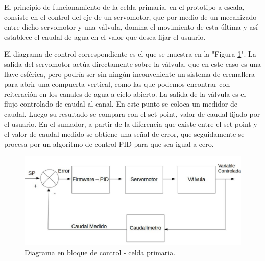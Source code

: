 El principio de funcionamiento de la celda primaria, en el prototipo a escala, consiste en el control del eje de un servomotor, que por medio de un mecanizado entre dicho servomotor y una válvula, domina el movimiento de esta última y así establece el caudal de agua en el valor que desea fijar el usuario.

El diagrama de control correspondiente es el que se muestra en la "Figura \ref{fig:CeldaPrimaria}". La salida del servomotor actúa directamente sobre la válvula, que en este caso es una llave esférica, pero podría ser sin ningún inconveniente un sistema de cremallera para abrir una compuerta vertical, como las que podemos encontrar con reiteración en los canales de agua a cielo abierto. La salida de la válvula es el flujo controlado de caudal al canal. En este punto se coloca un medidor de caudal. Luego su resultado se compara con el set point, valor de caudal fijado por el usuario. En el sumador, a partir de la diferencia que existe entre el set point y el valor de caudal medido se obtiene una señal de error, que seguidamente se procesa por un algoritmo de control PID para que sea igual a cero.

\begin{figure}[htpb]
\centering
\includegraphics[scale=.45]{./Figures/DiagramaEnBloqueDeControlCeldaPrimaria-V5.png}
\caption{Diagrama en bloque de control - celda primaria.}
\label{fig:CeldaPrimaria}
\end{figure}

